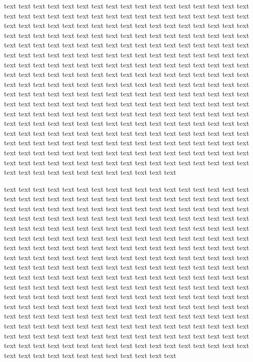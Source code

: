 \documentclass[traditabstract]{aa}
\begin{document}
\Planck text text text text text text text text text text text text text text text text text text text text text text text text text text text text text text text text text text text text text text text text text text text text text text text text text text text text text text text text text text text text text text text text text text text text text text text text text text text text text text text text text text text text text text text text text text text text text text text text text text text text text text text text text text text text text text text text text text text text text text text text text text text text text text text text text text text text text text text text text text text text text text text text text text text text text text text text text text text text text text text text text text text text text text text text text text text text text text text text text text text text text text text text text text text text text text text text text text text text text text text text text text text text text text text text text text text text text text text text text text text text text text text text text text text text text text text text text text text text text text text text text text text text text text text text text text text text text text text text text text text text text text text text text text text text text text text text text text text text text text text text text text text text text text text text text text text text text text text text text text text text text 

\Planck text text text text text text text text text text text text text text text text text text text text text text text text text text text text text text text text text text text text text text text text text text text text text text text text text text text text text text text text text text text text text text text text text text text text text text text text text text text text text text text text text text text text text text text text text text text text text text text text text text text text text text text text text text text text text text text text text text text text text text text text text text text text text text text text text text text text text text text text text text text text text text text text text text text text text text text text text text text text text text text text text text text text text text text text text text text text text text text text text text text text text text text text text text text text text text text text text text text text text text text text text text text text text text text text text text text text text text text text text text text text text text text text text text text text text text text text text text text text text text text text text text text text text text text text text text text text text text text text text text text text text text text text text text text text text text text text text text text text text text text text text text text text text text text text text text text text text text text text text text text text text 
\end{document}
